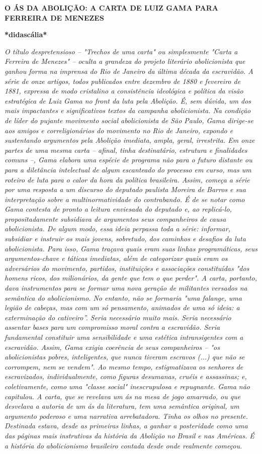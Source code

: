 \textbf{O ÁS DA ABOLIÇÃO: A CARTA DE LUIZ GAMA PARA FERREIRA DE MENEZES
}

\textbf{*didascália*}

\emph{O título despretensioso -- "Trechos de uma carta" ou simplesmente
"Carta a Ferreira de Menezes" -- oculta a grandeza do projeto literário
abolicionista que ganhou forma na imprensa do Rio de Janeiro da última
década da escravidão. A série de onze artigos, todos publicados entre
dezembro de 1880 e fevereiro de 1881, expressa de modo cristalino a
consistência ideológica e política da visão estratégica de Luiz Gama no
front da luta pela Abolição. É, sem dúvida, um dos mais impactantes e
significativos textos da campanha abolicionista. Na condição de líder do
pujante movimento social abolicionista de São Paulo, Gama dirige-se aos
amigos e correligionários do movimento no Rio de Janeiro, expondo e
sustentando argumentos pela Abolição imediata, ampla, geral, irrestrita.
Em onze partes de uma mesma carta -- afinal, tinha destinatário,
estrutura e finalidades comuns --, Gama elabora uma espécie de programa
não para o futuro distante ou para a diletância intelectual de algum
escanteado do processo em curso, mas um roteiro de luta para o calor da
hora da política brasileira. Assim, começa a série por uma resposta a um
discurso do deputado paulista Moreira de Barros e sua interpretação
sobre a multinormatividade do contrabando. É de se notar como Gama
contesta de pronto a leitura enviesada do deputado e, ao replicá-lo,
propositadamente subsidiava de argumentos seus companheiros de causa
abolicionista. De algum modo, essa ideia perpassa toda a série:
informar, subsidiar e instruir os mais jovens, sobretudo, dos caminhos e
desafios da luta abolicionista. Para isso, Gama traçava quais eram suas
linhas programáticas, seus argumentos-chave e táticas imediatas, além de
categorizar quais eram os adversários do movimento, partidos,
instituições e associações constituídas "dos homens ricos, dos
milionários, da gente que tem o que perder". A carta, portanto, dava
instrumentos para se formar uma nova geração de militantes versados na
semântica do abolicionismo. No entanto, não se formaria "uma falange,
uma legião de cabeças, mas com um só pensamento, animados de uma só
ideia: a exterminação do cativeiro''. Seria necessário muito mais. Seria
necessário assentar bases para um compromisso moral contra a escravidão.
Seria fundamental constituir uma sensibilidade e uma estética
intransigentes com a escravidão. Assim, Gama exigia coerência de seus
companheiros -- "os abolicionistas pobres, inteligentes, que nunca
tiveram escravos (...) que não se corrompem, nem se vendem". Ao mesmo
tempo, estigmatizava os senhores de escravizados, individualmente, como
figuras desumanas, cruéis e assassinas; e, coletivamente, como uma
"classe social" inescrupulosa e repugnante. Gama não capitulou. A carta,
que se revelava um ás na mesa de jogo amarrado, ou que desvelava a
autoria de um ás da literatura, tem uma semântica original, um argumento
poderoso e uma narrativa arrebatadora. Tinha os olhos no presente.
Destinada estava, desde as primeiras linhas, a ganhar a posteridade como
uma das páginas mais instrutivas da história da Abolição no Brasil e nas
Américas. É a história do abolicionismo brasileiro contada desde onde
realmente começou. }

